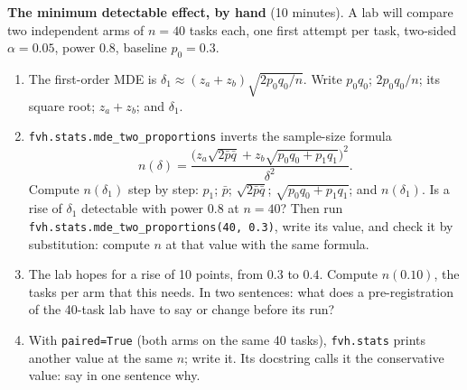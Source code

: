 \documentclass[11pt]{article}
\begin{document}
\begin{problem}\label{prob:B1}
\textbf{The minimum detectable effect, by hand} (10 minutes). A lab will
compare two independent arms of $n = 40$ tasks each, one first attempt per
task, two-sided $\alpha = 0.05$, power $0.8$, baseline $p_0 = 0.3$.
\begin{enumerate}
\item[(a)] The first-order MDE is
  $\delta_1 \approx (z_a + z_b)\sqrt{2 p_0 q_0 / n}$. Write $p_0 q_0$;
  $2 p_0 q_0 / n$; its square root; $z_a + z_b$; and $\delta_1$.
\item[(b)] \texttt{fvh.stats.mde\_two\_proportions} inverts the sample-size
  formula
  \[ n(\delta) = \frac{\bigl(z_a \sqrt{2 \bar p \bar q} + z_b \sqrt{p_0 q_0 + p_1 q_1}\bigr)^2}{\delta^2}. \]
  Compute $n(\delta_1)$ step by step: $p_1$; $\bar p$; $\sqrt{2 \bar p \bar q}$;
  $\sqrt{p_0 q_0 + p_1 q_1}$; and $n(\delta_1)$. Is a rise of $\delta_1$
  detectable with power $0.8$ at $n = 40$? Then run
  \texttt{fvh.stats.mde\_two\_proportions(40, 0.3)}, write its value, and
  check it by substitution: compute $n$ at that value with the same formula.
\item[(c)] The lab hopes for a rise of 10 points, from $0.3$ to $0.4$. Compute
  $n(0.10)$, the tasks per arm that this needs. In two sentences: what does a
  pre-registration of the 40-task lab have to say or change before its run?
\item[(d)] With \texttt{paired=True} (both arms on the same 40 tasks),
  \texttt{fvh.stats} prints another value at the same $n$; write it. Its
  docstring calls it the conservative value: say in one sentence why.
\end{enumerate}
\end{problem}
\end{document}
